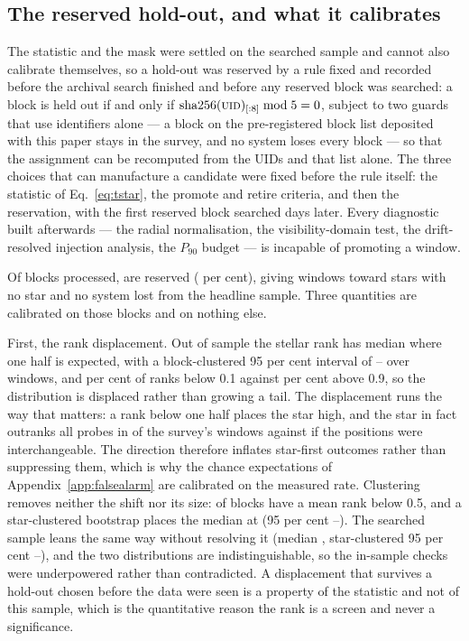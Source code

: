 \subsection{The reserved hold-out, and what it calibrates}
\label{sec:heldout}

The statistic and the mask were settled on the searched sample and cannot
also calibrate themselves, so a hold-out was reserved by a rule fixed and
recorded before the archival search finished and before any reserved block
was searched: a block is held out if and only if
$\mathrm{sha256}(\textsc{uid})_{[:8]} \bmod 5 = 0$, subject to two guards
that use identifiers alone --- a block on the pre-registered block list
deposited with this paper stays in the survey, and no system loses every
block --- so that the assignment can be recomputed from the UIDs and that
list alone. The three choices that can manufacture a candidate were fixed
before the rule itself: the statistic of Eq.~\ref{eq:tstar}, the promote and
retire criteria, and then the reservation, with the first reserved block
searched \HoLeadBlockDays{} days later. Every diagnostic built afterwards
--- the radial normalisation, the visibility-domain test, the drift-resolved
injection analysis, the $P_{90}$ budget --- is incapable of promoting a
window.

Of \NEbProcessedAll{} blocks processed, \NEbHeldOut{} are reserved
(\HoPctHeld{} per cent), giving \HoWin{} windows toward \HoStars{} stars with
no star and no system lost from the headline sample. Three quantities are
calibrated on those blocks and on nothing else.

First, the rank displacement. Out of sample the stellar rank has median
\HoRankMed{} where one half is expected, with a block-clustered 95 per cent
interval of \HoRankMedLo--\HoRankMedHi{} over \HoWin{} windows, and
\HOFracLoPct{} per cent of ranks below 0.1 against \HOFracHiPct{} per cent
above 0.9, so the distribution is displaced rather than growing a tail. The
displacement runs the way that matters: a rank below one half places the star
high, and the star in fact outranks all \NCtrl{} probes in \NsrFirstObs{} of
the survey's windows against \NsrFirstExp{} if the positions were
interchangeable. The direction therefore inflates star-first outcomes rather
than suppressing them, which is why the chance expectations of
Appendix~\ref{app:falsealarm} are calibrated on the measured rate.
Clustering removes neither the shift nor its size: \HOBlockBelow{} of
\HOBlockN{} blocks have a mean rank below 0.5, and a star-clustered bootstrap
places the median at \HOBootMed{} (95 per cent \HOBootLo--\HOBootHi). The
searched sample leans the same way without resolving it (median \SurvMedP,
star-clustered 95 per cent \SurvBootLo--\SurvBootHi), and the two
distributions are indistinguishable, so the in-sample checks were
underpowered rather than contradicted. A displacement that survives a
hold-out chosen before the data were seen is a property of the statistic and
not of this sample, which is the quantitative reason the rank is a screen and
never a significance.

